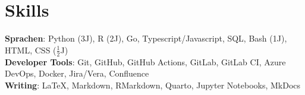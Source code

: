 \section{Skills}

\begin{itemize}[leftmargin=0.15in, label={}]
    \small{\item{
                    \textbf{Sprachen}{: Python (3J), R (2J), Go, Typescript/Javascript, SQL, Bash (1J), HTML, CSS ($\frac{1}{2}$J)} \\
                    \textbf{Developer Tools}{: Git, GitHub, GitHub Actions, GitLab, GitLab CI, Azure DevOps, Docker, Jira/Vera, Confluence} \\
                    \textbf{Writing}{: LaTeX, Markdown, RMarkdown, Quarto, Jupyter Notebooks, MkDocs}
              }}
\end{itemize}
